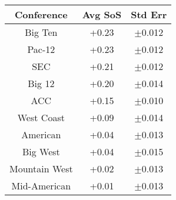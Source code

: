   \begin{tabular}{c|cc}
    Conference      & Avg SoS & Std Err\\
    \hline
    Big Ten         & +0.23   & $\pm$0.012\\
    Pac-12          & +0.23   & $\pm$0.012\\
    SEC             & +0.21   & $\pm$0.012\\
    Big 12          & +0.20   & $\pm$0.014\\
    ACC             & +0.15   & $\pm$0.010\\
    West Coast      & +0.09   & $\pm$0.014\\
    American        & +0.04   & $\pm$0.013\\
    Big West        & +0.04   & $\pm$0.015\\
    Mountain West   & +0.02   & $\pm$0.013\\
    Mid-American    & +0.01   & $\pm$0.013\\
  \end{tabular}